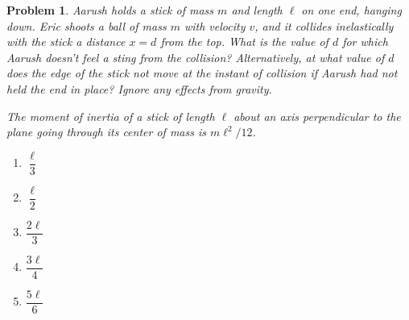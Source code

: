 \documentclass[12pt]{article}
\newcommand{\clearpts}{\addtocounter{tpts}{\value{cpts}} \setcounter{cpts}{0}}
\newcommand{\pts}[1]{\clearpts \setcounter{cpts}{#1}}
\theoremstyle{mystyle}
\newtheorem{pproblem}{Problem}
\begin{document}
\pts{2}
\begin{pproblem}
    Aarush holds a stick of mass $m$ and length $\ell$ on one end, hanging down.
    Eric shoots a ball of mass $m$ with velocity $v$, and it collides inelastically with
    the stick a distance $x=d$ from the top. What is the value of $d$ for which Aarush
    doesn't feel a sting from the collision? Alternatively, at what value of $d$ does
    the edge of the stick not move at the instant of collision if Aarush had not held the end in place? Ignore any effects from gravity.
    
    The moment of inertia of a stick of length $\ell$ about an axis perpendicular to the
    plane going through its center of mass is $m\ell^2/12$.

    \begin{figure}[H]
        \centering
    \end{figure}
    \begin{enumerate}[(\Alph*)]
        \item $\dfrac{\ell}{3}$
        \item $\dfrac{\ell}{2}$
        \item $\dfrac{2\ell}{3}$
        \item $\dfrac{3\ell}{4}$
        \item $\dfrac{5\ell}{6}$
    \end{enumerate}
\end{pproblem}
\end{document}
